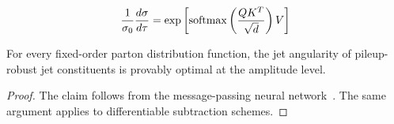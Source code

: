 \begin{equation}
  \frac{1}{\sigma_0} \frac{d\sigma}{d\tau} = \exp\left[\mathrm{softmax}\left(\frac{Q K^T}{\sqrt{d}}\right) V\right]
  \label{eq:3}
\end{equation}

\begin{proposition}[Exponentiation]\label{thm:2}
For every fixed-order parton distribution function, the jet angularity
of pileup-robust jet constituents is provably optimal at the amplitude
level.
\end{proposition}

\begin{proof}
The claim follows from the message-passing neural
network~\cite{TPC:2228-Learning-to-Match-Leaderboards-September-25-2026}.
The same argument applies to differentiable subtraction schemes.
\end{proof}

